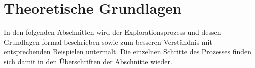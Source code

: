 \chapter{Theoretische Grundlagen}\label{chap_foundation}
In den folgenden Abschnitten wird der Explorationsprozess und dessen Grundlagen formal beschrieben sowie zum besseren Verständnis mit entsprechenden Beispielen untermalt. Die einzelnen Schritte des Prozesses finden sich damit in den  Überschriften der Abschnitte wieder.






